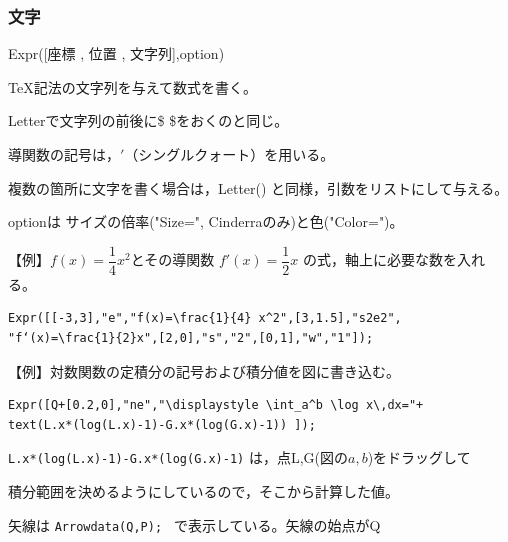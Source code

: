 \documentclass[papersize,a4paper,10pt,uplatex]{jsarticle}
\begin{document}
\subsubsection{文字}
\begin{description}

\vspace{\baselineskip}
\hypertarget{expr}{}
\item[関数]Expr([座標 , 位置 , 文字列],option)
\item[機能]\TeX 記法の文字列を与えて数式を書く。
\item[説明]Letterで文字列の前後に\$ \$をおくのと同じ。

導関数の記号は，$'$（シングルクォート）を用いる。

複数の箇所に文字を書く場合は，Letter() と同様，引数をリストにして与える。

optionは サイズの倍率("Size=", Cinderraのみ)と色("Color=")。

\vspace{\baselineskip}
【例】$f(x)=\dfrac{1}{4} x^2$とその導関数 $f'(x)=\dfrac{1}{2} x$ の式，軸上に必要な数を入れる。
\begin{verbatim}
Expr([[-3,3],"e","f(x)=\frac{1}{4} x^2",[3,1.5],"s2e2",
"f‘(x)=\frac{1}{2}x",[2,0],"s","2",[0,1],"w","1"]);
\end{verbatim}
\vspace{\baselineskip}
\begin{center} \end{center}

【例】対数関数の定積分の記号および積分値を図に書き込む。
\begin{verbatim}
Expr([Q+[0.2,0],"ne","\displaystyle \int_a^b \log x\,dx="+
text(L.x*(log(L.x)-1)-G.x*(log(G.x)-1)) ]);
\end{verbatim}

 \verb|L.x*(log(L.x)-1)-G.x*(log(G.x)-1)| は，点L,G(図の$a,b$)をドラッグして
 
 積分範囲を決めるようにしているので，そこから計算した値。
 
 矢線は \verb|Arrowdata(Q,P); | で表示している。矢線の始点がQ
\vspace{\baselineskip}
\begin{center} \end{center}



\end{description}
\end{document}
